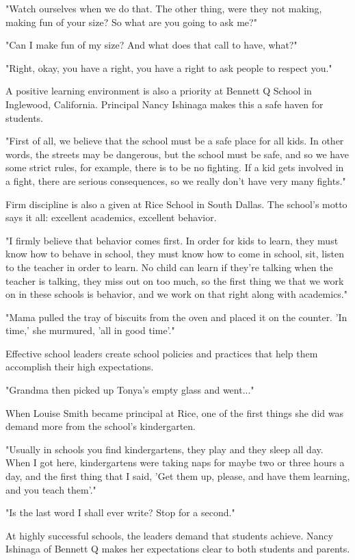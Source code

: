 "Watch ourselves when we do that.
The other thing, were they not making, making fun of your size?
So what are you going to ask me?"

"Can I make fun of my size?
And what does that call to have, what?"

"Right, okay, you have a right, you have a right to ask people to respect you."

A positive learning environment is also a priority at Bennett Q School in Inglewood, California.
Principal Nancy Ishinaga makes this a safe haven for students.

"First of all, we believe that the school must be a safe place for all kids.
In other words, the streets may be dangerous, but the school must be safe, and so we have some strict rules, for example, there is to be no fighting.
If a kid gets involved in a fight, there are serious consequences, so we really don't have very many fights."

Firm discipline is also a given at Rice School in South Dallas.
The school's motto says it all: excellent academics, excellent behavior.

"I firmly believe that behavior comes first.
In order for kids to learn, they must know how to behave in school, they must know how to come in school, sit, listen to the teacher in order to learn.
No child can learn if they're talking when the teacher is talking, they miss out on too much, so the first thing we that we work on in these schools is behavior, and we work on that right along with academics."

"Mama pulled the tray of biscuits from the oven and placed it on the counter.
'In time,' she murmured, 'all in good time'."

Effective school leaders create school policies and practices that help them accomplish their high expectations.

"Grandma then picked up Tonya's empty glass and went..."

When Louise Smith became principal at Rice, one of the first things she did was demand more from the school's kindergarten.

"Usually in schools you find kindergartens, they play and they sleep all day.
When I got here, kindergartens were taking naps for maybe two or three hours a day, and the first thing that I said, 'Get them up, please, and have them learning, and you teach them'."

"Is the last word I shall ever write?
Stop for a second."

At highly successful schools, the leaders demand that students achieve.
Nancy Ishinaga of Bennett Q makes her expectations clear to both students and parents.

